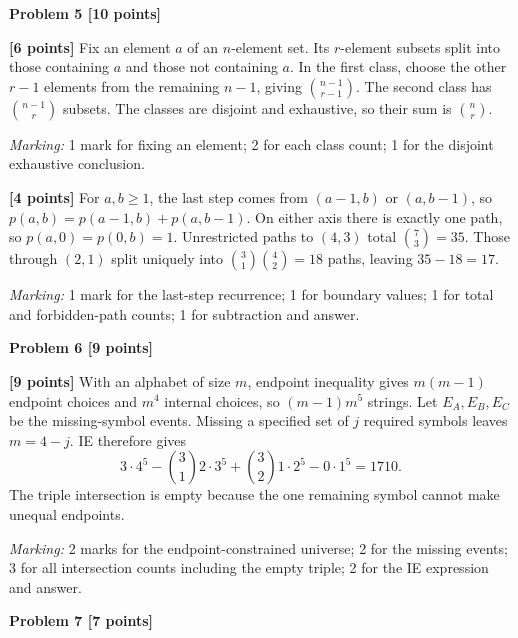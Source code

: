 \documentclass[12pt,letterpaper]{article}
\newcommand{\problemheading}[2][5\baselineskip]{\Needspace{#1}\par\noindent\hspace*{-0.625in}\textbf{#2}\par\nobreak\vspace{0.3em}}
\begin{document}
\vspace{0.65em}
\problemheading[\dimexpr 3\baselineskip+4\baselineskip\relax]{Problem 5 [10 points]}
\begin{description}[font=\normalfont,leftmargin=1.2em,labelsep=0.4em]
\item[(a)] \textbf{[6 points]} Fix an element $a$ of an $n$-element set. Its $r$-element subsets split into those containing $a$ and those not containing $a$. In the first class, choose the other $r-1$ elements from the remaining $n-1$, giving $\binom{n-1}{r-1}$. The second class has $\binom{n-1}{r}$ subsets. The classes are disjoint and exhaustive, so their sum is $\binom nr$.
\par\textit{Marking:} 1 mark for fixing an element; 2 for each class count; 1 for the disjoint exhaustive conclusion.
\item[(b)] \textbf{[4 points]} For $a,b\ge1$, the last step comes from $(a-1,b)$ or $(a,b-1)$, so $p(a,b)=p(a-1,b)+p(a,b-1)$. On either axis there is exactly one path, so $p(a,0)=p(0,b)=1$. Unrestricted paths to $(4,3)$ total $\binom73=35$. Those through $(2,1)$ split uniquely into $\binom31\binom42=18$ paths, leaving $35-18=17$.
\par\textit{Marking:} 1 mark for the last-step recurrence; 1 for boundary values; 1 for total and forbidden-path counts; 1 for subtraction and answer.
\end{description}
\vspace{0.65em}
\problemheading[\dimexpr 3\baselineskip+4\baselineskip\relax]{Problem 6 [9 points]}
\begin{description}[font=\normalfont,leftmargin=1.2em,labelsep=0.4em]
\item[] \textbf{[9 points]} With an alphabet of size $m$, endpoint inequality gives $m(m-1)$ endpoint choices and $m^4$ internal choices, so $(m-1)m^5$ strings. Let $E_A,E_B,E_C$ be the missing-symbol events. Missing a specified set of $j$ required symbols leaves $m=4-j$. IE therefore gives\[3\cdot4^5-\binom31 2\cdot3^5+\binom32 1\cdot2^5-0\cdot1^5=1710.\]The triple intersection is empty because the one remaining symbol cannot make unequal endpoints.
\par\textit{Marking:} 2 marks for the endpoint-constrained universe; 2 for the missing events; 3 for all intersection counts including the empty triple; 2 for the IE expression and answer.
\end{description}
\vspace{0.65em}
\problemheading[\dimexpr 3\baselineskip+4\baselineskip\relax]{Problem 7 [7 points]}
\end{document}
